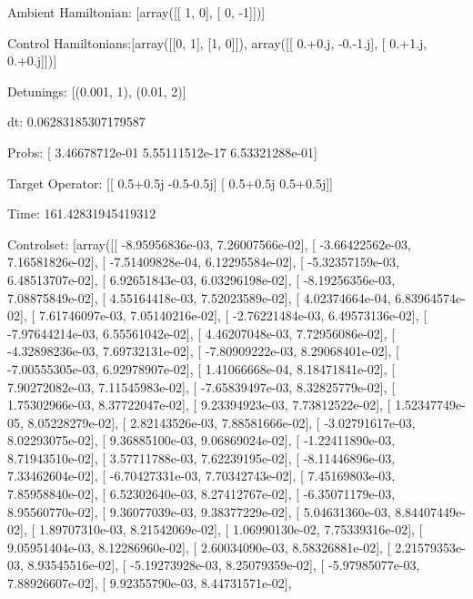\documentclass{article}
\begin{document}
    

\newpage

Ambient Hamiltonian: [array([[ 1,  0],
       [ 0, -1]])]

Control Hamiltonians:[array([[0, 1],
       [1, 0]]), array([[ 0.+0.j, -0.-1.j],
       [ 0.+1.j,  0.+0.j]])]

Detunings: [(0.001, 1), (0.01, 2)]

 dt: 0.06283185307179587

Probs: [  3.46678712e-01   5.55111512e-17   6.53321288e-01]

Target Operator: [[ 0.5+0.5j -0.5-0.5j]
 [ 0.5+0.5j  0.5+0.5j]]

Time: 161.42831945419312

Controlset: [array([[ -8.95956836e-03,   7.26007566e-02],
       [ -3.66422562e-03,   7.16581826e-02],
       [ -7.51409828e-04,   6.12295584e-02],
       [ -5.32357159e-03,   6.48513707e-02],
       [  6.92651843e-03,   6.03296198e-02],
       [ -8.19256356e-03,   7.08875849e-02],
       [  4.55164418e-03,   7.52023589e-02],
       [  4.02374664e-04,   6.83964574e-02],
       [  7.61746097e-03,   7.05140216e-02],
       [ -2.76221484e-03,   6.49573136e-02],
       [ -7.97644214e-03,   6.55561042e-02],
       [  4.46207048e-03,   7.72956086e-02],
       [ -4.32898236e-03,   7.69732131e-02],
       [ -7.80909222e-03,   8.29068401e-02],
       [ -7.00555305e-03,   6.92978907e-02],
       [  1.41066668e-04,   8.18471841e-02],
       [  7.90272082e-03,   7.11545983e-02],
       [ -7.65839497e-03,   8.32825779e-02],
       [  1.75302966e-03,   8.37722047e-02],
       [  9.23394923e-03,   7.73812522e-02],
       [  1.52347749e-05,   8.05228279e-02],
       [  2.82143526e-03,   7.88581666e-02],
       [ -3.02791617e-03,   8.02293075e-02],
       [  9.36885100e-03,   9.06869024e-02],
       [ -1.22411890e-03,   8.71943510e-02],
       [  3.57711788e-03,   7.62239195e-02],
       [ -8.11446896e-03,   7.33462604e-02],
       [ -6.70427331e-03,   7.70342743e-02],
       [  7.45169803e-03,   7.85958840e-02],
       [  6.52302640e-03,   8.27412767e-02],
       [ -6.35071179e-03,   8.95560770e-02],
       [  9.36077039e-03,   9.38377229e-02],
       [  5.04631360e-03,   8.84407449e-02],
       [  1.89707310e-03,   8.21542069e-02],
       [  1.06990130e-02,   7.75339316e-02],
       [  9.05951404e-03,   8.12286960e-02],
       [  2.60034090e-03,   8.58326881e-02],
       [  2.21579353e-03,   8.93545516e-02],
       [ -5.19273928e-03,   8.25079359e-02],
       [ -5.97985077e-03,   7.88926607e-02],
       [  9.92355790e-03,   8.44731571e-02],
\end{document}
